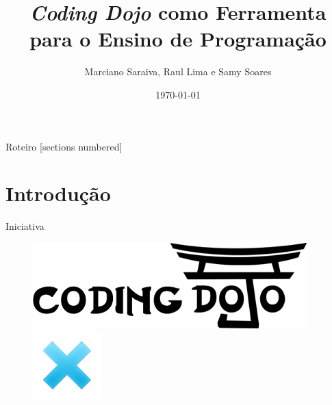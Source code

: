 \documentclass[10pt]{beamer}
\title{\textit{Coding Dojo} como Ferramenta para o Ensino de Programação}
\date{\today}
\author{Marciano Saraiva, Raul Lima e Samy Soares}
\institute{Universidade Federal do Cear\'a - Campus de Quixad\'a}
\begin{document}
\maketitle

\begin{frame}{Roteiro}
  [sections numbered]
  \tableofcontents[hideallsubsections]
\end{frame}

\section{Introdu\c{c}\~ao}

\begin{frame}{Iniciativa}

\begin{figure}[H]
  \centering
   \begin{minipage}[b]{0.25\textwidth}\end{minipage}
  \hfill
  \begin{minipage}[b]{0.3\textwidth}
	\includegraphics[width=\textwidth]{figuras/dojos.png}
  \end{minipage}
  \hfill
  \begin{minipage}[b]{0.1\textwidth}
    \includegraphics[width=\textwidth]{figuras/vs.png}

\end{minipage}
\end{figure}
\end{frame}
\end{document}
